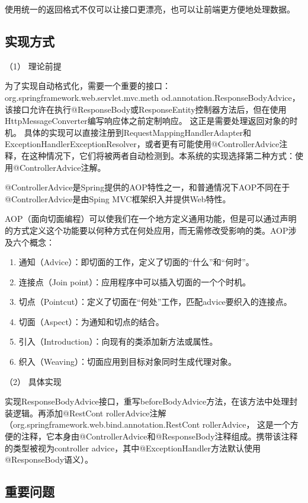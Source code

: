 使用统一的返回格式不仅可以让接口更漂亮，也可以让前端更方便地处理数据。

\subsection{实现方式}

（1） 理论前提

为了实现自动格式化，需要一个重要的接口： org.springframework.web.servlet.mvc.meth od.annotation.ResponseBodyAdvice，该接口允许在执行@ResponseBody或ResponseEntity控制器方法后，但在使用HttpMessageConverter编写响应体之前定制响应。 这正是需要处理返回对象的时机。
具体的实现可以直接注册到RequestMappingHandlerAdapter和ExceptionHandlerExceptionResolver，或者更有可能使用@ControllerAdvice注释，在这种情况下，它们将被两者自动检测到。本系统的实现选择第二种方式：使用@ControllerAdvice注解。

@ControllerAdvice是Spring提供的AOP特性之一，和普通情况下AOP不同在于@ControllerAdvice是由Sping MVC框架织入并提供Web特性。

AOP（面向切面编程）可以使我们在一个地方定义通用功能，但是可以通过声明的方式定义这个功能要以何种方式在何处应用，而无需修改受影响的类\cite{.SpringInAction}。AOP涉及六个概念：
\begin{enumerate}[label=\circled{\arabic*}]
  \item 通知（Advice）：即切面的工作，定义了切面的“什么”和“何时”。
  \item 连接点（Join point）：应用程序中可以插入切面的一个个时机。
  \item 切点（Pointcut）：定义了切面在“何处”工作，匹配advice要织入的连接点。
  \item 切面（Aspect）：为通知和切点的结合。
  \item 引入（Introduction）：向现有的类添加新方法或属性。
  \item 织入（Weaving）：切面应用到目标对象同时生成代理对象。
\end{enumerate}

（2） 具体实现

实现ResponseBodyAdvice接口，重写beforeBodyAdvice方法，在该方法中处理封装逻辑。再添加@RestCont rollerAdvice注解（org.springframework.web.bind.annotation.RestCont rollerAdvice，
这是一个方便的注释，它本身由@ControllerAdvice和@ResponseBody注释组成。携带该注释的类型被视为controller advice，其中@ExceptionHandler方法默认使用@ResponseBody语义）。

\subsection{重要问题}

